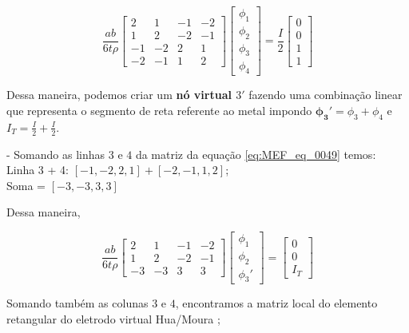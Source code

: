\documentclass[
12pt,
a4paper,
oneside,
chapter=TITLE,
sumario=tradicional
]{abntex2}
\begin{document}
\begin{equation}
	\frac{ab}{6t\rho} \begin{bmatrix} 2 & 1 & -1 & -2 \\ 
		1 & 2 & -2 & -1 \\ 
		-1 & -2 & 2 & 1 \\ 
		-2 & -1 & 1 & 2 \end{bmatrix}
			\begin{bmatrix}
			\phi_1 \\
			\phi_2 \\
			\phi_3 \\
			\phi_4
		\end{bmatrix}
		=
	\frac{I}{2}
	\begin{bmatrix}  
		0 \\  
		0 \\  
		1 \\ 
		1  
	\end{bmatrix}  
	\label{eq:MEF_eq_0049}
\end{equation}



Dessa maneira, podemos criar um \textbf{nó virtual $3'$} fazendo uma combinação linear que representa o segmento de reta referente ao metal impondo $\mathbf{\phi_3'}  = \phi_3 + \phi_4$  e $I_T = \frac{I}{2} +\frac{I}{2}$.

- Somando as linhas $3$ e $4$ da matriz da equação \ref{eq:MEF_eq_0049} temos:\\
Linha 3 + 4: $[-1, -2, 2, 1] + [-2, -1, 1, 2]$; \\
Soma  = $[-3, -3, 3, 3]$

Dessa maneira,

$$
	\frac{ab}{6t\rho} \begin{bmatrix} 2 & 1 & -1 & -2 \\ 
	1 & 2 & -2 & -1 \\ 
	-3 & -3 & 3 & 3 \end{bmatrix}
\begin{bmatrix}
	\phi_1 \\
	\phi_2 \\
	\phi_3'
\end{bmatrix}
=
\begin{bmatrix}  
	0 \\  
	0 \\  
	I_T
\end{bmatrix}  
$$

Somando também as colunas $3$ e $4$, encontramos a matriz local do elemento retangular do eletrodo virtual Hua/Moura \cite{moura2013estimaccao};
\end{document}
